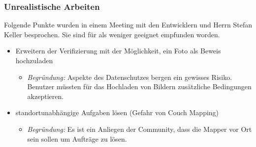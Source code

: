 \subsubsection{Unrealistische Arbeiten}
Folgende Punkte wurden in einem Meeting mit den Entwicklern und Herrn Stefan Keller besprochen. 
Sie sind für \kort{} als weniger geeignet empfunden worden.

\begin{itemize}
	\item Erweitern der Verifizierung mit der Möglichkeit, ein Foto als Beweis hochzuladen
	\begin{itemize}
	  \item \emph{Begründung:} Aspekte des Datenschutzes bergen ein gewisses Risiko. Benutzer müssten für das Hochladen von Bildern zusätzliche Bedingungen akzeptieren.
	\end{itemize}
	\item standortunabhängige Aufgaben lösen (Gefahr von Couch Mapping)
	\begin{itemize}
	  \item \emph{Begründung:} Es ist ein Anliegen der  Community, dass die Mapper vor Ort sein sollen um Aufträge zu lösen. 
	\end{itemize}
\end{itemize}

